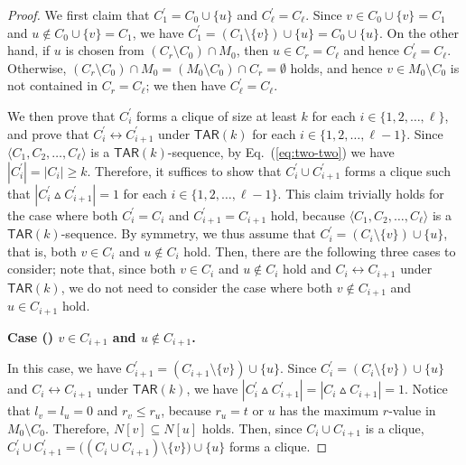 \documentclass{llncs}
\newcommand{\onestep}{\leftrightarrow}
\newcommand{\TAR}[1]{\mathsf{TAR}(#1)}
\newcommand{\symdiff}[2]{#1 \vartriangle #2}
\newcommand{\ini}{0}
\newcommand{\tar}{r}
\newcommand{\cliq}{C}
\newcounter{one}
\newcommand{\one}{{\rm \roman{one}}}
\newcounter{two}
\newcounter{three}
\begin{document}
\begin{proof}
	We first claim that $\cliq_{1}^\prime = \cliq_{\ini} \cup \{u\}$ and $\cliq_{\ell}^\prime = \cliq_{\ell}$. 
	Since $v \in \cliq_{\ini} \cup \{v\} = \cliq_1$ and $u \not\in \cliq_{\ini} \cup \{v\} = \cliq_1$, we have $\cliq_{1}^\prime = (\cliq_1 \setminus \{v\}) \cup \{u\} = \cliq_{\ini} \cup \{u\}$. 
	On the other hand, if $u$ is chosen from $(\cliq_{\tar} \setminus \cliq_{\ini}) \cap M_{0}$, then $u \in \cliq_{\tar} = \cliq_{\ell}$ and hence $\cliq_{\ell}^\prime = \cliq_{\ell}$.
	Otherwise, $(\cliq_{\tar} \setminus \cliq_{\ini}) \cap M_{0} = (M_{0} \setminus \cliq_{\ini}) \cap \cliq_{\tar} = \emptyset$ holds, and hence $v \in M_{0} \setminus \cliq_{\ini}$ is not contained in $\cliq_{\tar} = \cliq_{\ell}$;
we then have $\cliq_{\ell}^\prime = \cliq_{\ell}$.

	We then prove that $\cliq_i^\prime$ forms a clique of size at least $k$ for each $i \in \{1,2,\ldots,\ell\}$, and prove that $\cliq_{i}^\prime \onestep \cliq_{i+1}^\prime$ under $\TAR{k}$ for each $i \in \{1,2,\ldots, \ell-1\}$. 
	Since $\langle \cliq_{1}, \cliq_2, \ldots, \cliq_{\ell} \rangle$ is a $\TAR{k}$-sequence, by Eq.~(\ref{eq:two-two}) we have $|\cliq_i^\prime| = |\cliq_i| \ge k$. 
	Therefore, it suffices to show that $\cliq_{i}^\prime \cup \cliq_{i+1}^\prime$ forms a clique such that $|\symdiff{\cliq_{i}^\prime}{\cliq_{i+1}^\prime}| = 1$ for each $i \in \{1,2,\ldots, \ell-1\}$.
	This claim trivially holds for the case where both $\cliq_i^\prime = \cliq_i$ and $\cliq_{i+1}^\prime = \cliq_{i+1}$ hold, because $\langle \cliq_{1}, \cliq_2, \ldots, \cliq_{\ell} \rangle$ is a $\TAR{k}$-sequence.
	By symmetry, we thus assume that $\cliq_{i}^\prime = (\cliq_{i} \setminus \{v\}) \cup \{u\}$, that is, both $v \in \cliq_{i}$ and $u \notin \cliq_{i}$ hold.
	Then, there are the following three cases to consider;
note that, since both $v \in \cliq_{i}$ and $u \notin \cliq_{i}$ hold and $\cliq_i \onestep \cliq_{i+1}$ under $\TAR{k}$, we do not need to consider the case where both $v \not\in \cliq_{i+1}$ and $u \in \cliq_{i+1}$ hold.
\medskip

\noindent
	{\bf Case (\one) $v \in \cliq_{i+1}$ and $u \notin \cliq_{i+1}$.}
	
	In this case, we have $\cliq_{i+1}^\prime = (\cliq_{i+1} \setminus \{v\}) \cup \{u\}$. 
	Since $\cliq_{i}^\prime = (\cliq_{i} \setminus \{v\}) \cup \{u\}$ and $\cliq_i \onestep \cliq_{i+1}$ under $\TAR{k}$, we have $|\symdiff{\cliq_{i}^\prime}{\cliq_{i+1}^\prime}| = |\symdiff{\cliq_i}{\cliq_{i+1}}| = 1$.
	Notice that $l_v = l_u = 0$ and $r_v \le r_u$, because $r_u = t$ or $u$ has the maximum $r$-value in $M_{0} \setminus \cliq_{\ini}$. 
	Therefore, $N[v] \subseteq N[u]$ holds.
	Then, since $\cliq_{i} \cup \cliq_{i+1}$ is a clique, $\cliq_{i}^\prime \cup \cliq_{i+1}^\prime = \bigl( (\cliq_{i} \cup \cliq_{i+1}) \setminus \{v\} \bigr) \cup \{u\}$ forms a clique.
\medskip


\end{proof}
\end{document}
